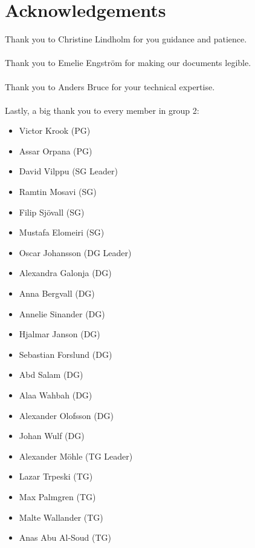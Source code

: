 \documentclass{article}
\begin{document}
\section{Acknowledgements}
    Thank you to Christine Lindholm for you guidance and patience. \\ \\
    Thank you to Emelie Engström for making our documents legible. \\ \\
    Thank you to Anders Bruce for your technical expertise. \\ \\
    Lastly, a big thank you to every member in group 2:
    \begin{itemize}
        \item Victor Krook (PG)
        \item Assar Orpana (PG)
        \item David Vilppu (SG Leader)
        \item Ramtin Mosavi (SG)
        \item Filip Sjövall (SG)
        \item Mustafa Elomeiri (SG)
        \item Oscar Johansson (DG Leader)
        \item Alexandra Galonja (DG)
        \item Anna Bergvall (DG)
        \item Annelie Sinander (DG)
        \item Hjalmar Janson (DG)
        \item Sebastian Forslund (DG)
        \item Abd Salam (DG)
        \item Alaa Wahbah (DG)
        \item Alexander Olofsson (DG)
        \item Johan Wulf (DG)
        \item Alexander Möhle (TG Leader)
        \item Lazar Trpeski (TG)
        \item Max Palmgren (TG)
        \item Malte Wallander (TG)
        \item Anas Abu Al-Soud (TG)
    \end{itemize}
\end{document}
